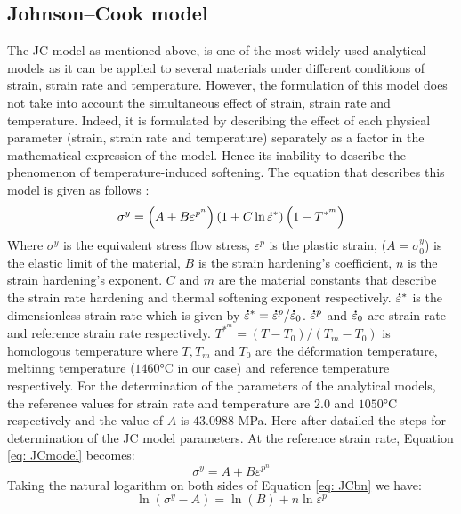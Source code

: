 \documentclass[twoside,english,1p,final,sort&compress]{elsarticle}
\theoremstyle{plain}
\newcommand{\mdot}[1]{\accentset{\mbox{\bfseries .}}{#1}}
\begin{document}
\subsection{Johnson--Cook model\label{sec:JC}}
The JC model as mentioned above, is one of the most widely used analytical models as it can be applied to several materials under different conditions of strain, strain rate and temperature. However, the formulation of this model does not take into account the simultaneous effect of strain, strain rate and temperature. Indeed, it is formulated by describing the effect of each physical parameter (strain, strain rate and temperature) separately as a factor in the mathematical expression of the model. Hence its inability to describe the phenomenon of temperature-induced softening. The equation that describes this model is given as follows \cite{Johnson-1985}:
\begin{equation}
\label{eq: JCmodel}
\sigma^y = \left(A + B\varepsilon^{p^n}\right)\left(1+C\ln\mdot\varepsilon^*\right)\left(1-T^{*^m}\right)
\end{equation}
Where $\sigma^y$ is the equivalent stress flow stress, $\varepsilon^p$ is the plastic strain, ($A=\sigma^y_0$) is the elastic limit of the material, $B$ is the strain hardening's coefficient, $n$ is the strain hardening's exponent. $C$ and $m$ are the material constants that describe the strain rate hardening and thermal softening exponent respectively. $\mdot\varepsilon^*$ is the dimensionless strain rate which is given by $\mdot\varepsilon^* = \mdot\varepsilon^p/\mdot\varepsilon_0$. $\mdot\varepsilon^p$ and $\mdot\varepsilon_0$ are strain rate and reference strain rate respectively. $T^{*^m} = (T-T_0)/(T_m - T_0)$ is homologous temperature where $T, T_m$ and $T_0$ are the déformation temperature, meltinng temperature ($1460$°C in our case) and reference temperature respectively. For the determination of the parameters of the analytical models, the reference values for strain rate and temperature are $2.0$ and $1050$°C respectively and the value of $A$ is $43.0988$ MPa. Here after datailed the steps for determination of the JC model parameters.
At the reference strain rate, Equation \ref{eq: JCmodel} becomes:
\begin{equation}
\label{eq: JCbn}
\sigma^y = A + B\varepsilon^{p^n}
\end{equation}
Taking the natural logarithm on both sides of Equation \ref{eq: JCbn} we have:
\begin{equation}
\label{eq:JClog1}
\ln\left(\sigma^y-A\right)= \ln(B) + n\ln\varepsilon^p
\end{equation}
\end{document}
